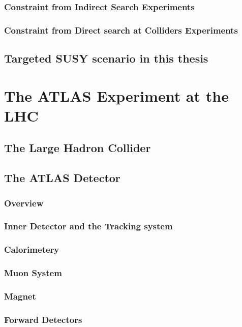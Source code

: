 		\subsubsection{Constraint from Indirect Search Experiments}
		\subsubsection{Constraint from Direct search at Colliders Experiments} 
%
	\subsection{Targeted SUSY scenario in this thesis} 
%
\section{The ATLAS Experiment at the LHC}
	\subsection{The Large Hadron Collider} 
	\subsection{The ATLAS Detector}
		\subsubsection{Overview}
		\subsubsection{Inner Detector and the Tracking system}
		\subsubsection{Calorimetery}
		\subsubsection{Muon System}
		\subsubsection{Magnet}
		\subsubsection{Forward Detectors}
